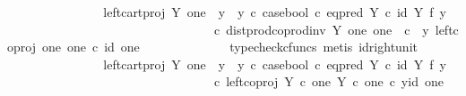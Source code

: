 \begin{isabellebody}
\ \ \ \ \ \ \ \ \ \ \isamarkupfalse%
\ \isamarkupfalse%
\ {\isachardoublequoteopen}{\isachardot}{\kern0pt}{\isachardot}{\kern0pt}{\isachardot}{\kern0pt}\ {\isacharequal}{\kern0pt}\ {\isacharparenleft}{\kern0pt}left{\isacharunderscore}{\kern0pt}cart{\isacharunderscore}{\kern0pt}proj\ Y\ one\ {\isasymamalg}\ {\isacharparenleft}{\kern0pt}{\isacharparenleft}{\kern0pt}y{}\ {\isasymamalg}\ y{}{\isacharparenright}{\kern0pt}\ {\isasymcirc}\isactrlsub c\ case{\isacharunderscore}{\kern0pt}bool\ {\isasymcirc}\isactrlsub c\ eq{\isacharunderscore}{\kern0pt}pred\ Y\ {\isasymcirc}\isactrlsub c\ {\isacharparenleft}{\kern0pt}id\ Y\ {\isasymtimes}\isactrlsub f\ y{}{\isacharparenright}{\kern0pt}{\isacharparenright}{\kern0pt}{\isacharparenright}{\kern0pt}\ \isanewline
\ \ \ \ \ \ \ \ \ \ \ \ \ \ \ \ \ \ \ \ \ \ \ \ \ \ \ \ \ \ \ \ \ {\isasymcirc}\isactrlsub c\ dist{\isacharunderscore}{\kern0pt}prod{\isacharunderscore}{\kern0pt}coprod{\isacharunderscore}{\kern0pt}inv\ Y\ one\ one\ \ {\isasymcirc}\isactrlsub c\ \ {\isasymlangle}y{\isacharcomma}{\kern0pt}\ left{\isacharunderscore}{\kern0pt}coproj\ one\ one\ {\isasymcirc}\isactrlsub c\ id\ one{\isasymrangle}{\isachardoublequoteclose}\isanewline
\ \ \ \ \ \ \ \ \ \ \ \ \isamarkupfalse%
\ {\isacharparenleft}{\kern0pt}typecheck{\isacharunderscore}{\kern0pt}cfuncs{\isacharcomma}{\kern0pt}\ metis\ id{\isacharunderscore}{\kern0pt}right{\isacharunderscore}{\kern0pt}unit{}{\isacharparenright}{\kern0pt}\isanewline
\ \ \ \ \ \ \ \ \ \ \isamarkupfalse%
\ \isamarkupfalse%
\ {\isachardoublequoteopen}{\isachardot}{\kern0pt}{\isachardot}{\kern0pt}{\isachardot}{\kern0pt}\ {\isacharequal}{\kern0pt}\ {\isacharparenleft}{\kern0pt}left{\isacharunderscore}{\kern0pt}cart{\isacharunderscore}{\kern0pt}proj\ Y\ one\ {\isasymamalg}\ {\isacharparenleft}{\kern0pt}{\isacharparenleft}{\kern0pt}y{}\ {\isasymamalg}\ y{}{\isacharparenright}{\kern0pt}\ {\isasymcirc}\isactrlsub c\ case{\isacharunderscore}{\kern0pt}bool\ {\isasymcirc}\isactrlsub c\ eq{\isacharunderscore}{\kern0pt}pred\ Y\ {\isasymcirc}\isactrlsub c\ {\isacharparenleft}{\kern0pt}id\ Y\ {\isasymtimes}\isactrlsub f\ y{}{\isacharparenright}{\kern0pt}{\isacharparenright}{\kern0pt}{\isacharparenright}{\kern0pt}\ \isanewline
\ \ \ \ \ \ \ \ \ \ \ \ \ \ \ \ \ \ \ \ \ \ \ \ \ \ \ \ \ \ \ \ \ {\isasymcirc}\isactrlsub c\ left{\isacharunderscore}{\kern0pt}coproj\ {\isacharparenleft}{\kern0pt}Y\ {\isasymtimes}\isactrlsub c\ one{\isacharparenright}{\kern0pt}\ {\isacharparenleft}{\kern0pt}Y\ {\isasymtimes}\isactrlsub c\ one{\isacharparenright}{\kern0pt}\ {\isasymcirc}\isactrlsub c\ {\isasymlangle}y{\isacharcomma}{\kern0pt}id\ one{\isasymrangle}{\isachardoublequoteclose}\isanewline

\end{isabellebody}
